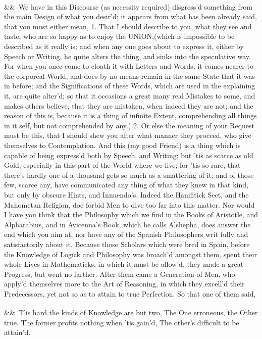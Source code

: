 \documentclass[12pt]{article}
\newcommand{\para}[1][]{\par\noindent\ifx&#1&\else\textsuperscript{\footnotesize #1}~\fi}
\begin{document}
\para We have in this Discourse (as necessity required) disgress'd something from the main Design of what you desir'd; it appears from what has been already said, that you must either mean, 1. That I should describe to you, what they see and taste, who are so happy as to enjoy the UNION,(which is impossible to be described as it really is; and when any one goes about to express it, either by Speech or Writing, he quite alters the thing, and sinks into the speculative way. For when you once come to cloath it with Letters and Words, it comes nearer to the corporeal World, and does by no means remain in the same State that it was in before; and the Significations of these Words, which are used in the explaining it, are quite alter'd; so that it occasions a great many real Mistakes to some, and makes others believe, that they are mistaken, when indeed they are not; and the reason of this is, because it is a thing of infinite Extent, comprehending all things in it self, but not comprehended by any.) 2. Or else the meaning of your Request must be this, that I should shew you after what manner they proceed, who give themselves to Contemplation. And this (my good Friend) is a thing which is capable of being express'd both by Speech, and Writing; but 'tis as scarce as old Gold, especially in this part of the World where we live; for 'tis so rare, that there's hardly one of a thousand gets so much as a smattering of it; and of those few, scarce any, have communicated any thing of what they knew in that kind, but only by obscure Hints, and Innuendo's. Indeed the Hanifitick Sect, and the Mahometan Religion, doe forbid Men to dive too far into this matter. Nor would I have you think that the Philosophy which we find in the Books of Aristotle, and Alpharabius, and in Avicenna's Book, which he calls Alshepha, does answer the end which you aim at, nor have any of the Spanish Philosophers writ fully and satisfactorily about it. Because those Scholars which were bred in Spain, before the Knowledge of Logick and Philosophy was broach'd amongst them, spent their whole Lives in Mathematicks, in which it must be allow'd, they made a great Progress, but went no farther. After them came a Generation of Men, who apply'd themselves more to the Art of Reasoning, in which they excell'd their Predecessors, yet not so as to attain to true Perfection. So that one of them said,

\para T'is hard the kinds of Knowledge are but two, The One erroneous, the Other true. The former profits nothing when 'tis gain'd, The other's difficult to be attain'd.
\end{document}
